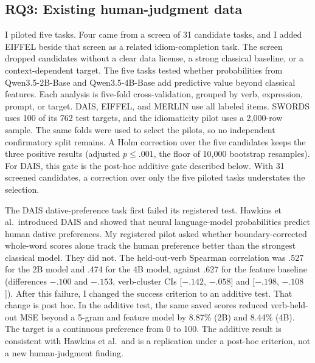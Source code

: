 \documentclass[11pt]{article}
\begin{document}
\subsection{RQ3: Existing human-judgment data}

I piloted five tasks. Four came from a screen of 31 candidate tasks, and I
added EIFFEL beside that screen as a related idiom-completion task. The screen
dropped candidates without a clear data license, a strong classical baseline,
or a context-dependent target. The five tasks tested whether probabilities
from Qwen3.5-2B-Base and Qwen3.5-4B-Base \citep{qwen35} add predictive value
beyond classical features.
Each analysis is five-fold cross-validation, grouped by verb, expression,
prompt, or target. DAIS, EIFFEL, and MERLIN use all labeled items. SWORDS uses
100 of its 762 test targets, and the idiomaticity pilot uses a 2,000-row
sample. The same folds were used to select the pilots, so no independent
confirmatory split remains. A Holm correction over the five candidates keeps
the three positive results (adjusted $p\le.001$, the floor of 10,000
bootstrap resamples). For DAIS, this gate is
the post-hoc additive gate described below. With 31 screened candidates, a
correction over only the five piloted tasks understates the selection.

The DAIS dative-preference task \citep{hawkins2020dais} first failed its
registered test. Hawkins et al.\ introduced DAIS and showed that neural
language-model probabilities predict human dative preferences. My registered
pilot asked whether boundary-corrected whole-word scores alone track the
human preference better than the strongest classical model. They did not. The
held-out-verb Spearman correlation was .527 for the 2B model and .474 for the
4B model, against .627 for the feature baseline (differences $-.100$ and
$-.153$, verb-cluster CIs [$-.142$, $-.058$] and [$-.198$, $-.108$]). After
this failure, I changed the success criterion to an additive test. That change
is post hoc. In the additive test, the same saved scores reduced
verb-held-out MSE beyond a 5-gram and feature model by 8.87\% (2B) and 8.44\%
(4B). The target is a continuous preference from 0 to 100. The additive
result is consistent with Hawkins et al.\ and is a replication under a
post-hoc criterion, not a new human-judgment finding.
\end{document}
